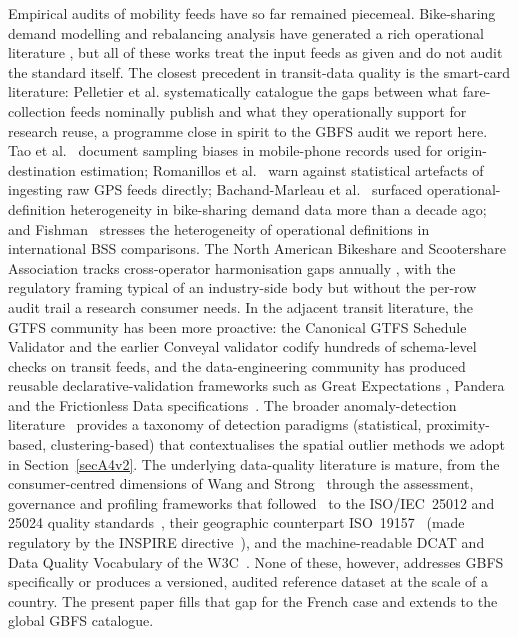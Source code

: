\documentclass[11pt,a4paper]{article}
\begin{document}
Empirical audits of mobility feeds have so far remained piecemeal.
Bike-sharing demand modelling and rebalancing analysis have generated
a rich operational literature
\cite{Buehler2017BikeShare,Medard2017Rebalancing,Eren2020Review}, but
all of these works treat the input feeds as given and do not audit
the standard itself. The closest precedent in transit-data quality
is the smart-card literature: Pelletier et al.
\cite{Pelletier2011SmartCard} systematically catalogue the gaps
between what fare-collection feeds nominally publish and what they
operationally support for research reuse, a programme close in spirit to
the GBFS audit we report here.
Tao et al.~\cite{Tao2020} document sampling biases in
mobile-phone records used for origin-destination estimation;
Romanillos et al.~\cite{Romanillos2016} warn against
statistical artefacts of ingesting raw GPS feeds directly;
Bachand-Marleau et al.~\cite{BachandMarleau2012} surfaced
operational-definition heterogeneity in bike-sharing demand data
more than a decade ago; and Fishman~\cite{Fishman2016} stresses the
heterogeneity of operational definitions in international BSS
comparisons. The North American Bikeshare and Scootershare
Association tracks cross-operator harmonisation gaps annually
\cite{NABSA2024StateOfIndustry}, with the regulatory framing
typical of an industry-side body but without the per-row audit
trail a research consumer needs.
In the adjacent transit literature, the GTFS community has been more
proactive: the Canonical GTFS Schedule Validator
\cite{MobilityData2024Validator} and the earlier Conveyal validator
\cite{Antrim2013Conveyal} codify hundreds of schema-level checks on
transit feeds, and the data-engineering community has produced reusable
declarative-validation frameworks such as Great Expectations
\cite{GreatExpectations2024}, Pandera~\cite{Pandera2024} and the
Frictionless Data specifications~\cite{FrictionlessData2023}.
The broader anomaly-detection literature~\cite{Chandola2009AnomalyDetection}
provides a taxonomy of detection paradigms (statistical, proximity-based,
clustering-based) that contextualises the spatial outlier methods we
adopt in Section~\ref{secA4v2}.
The underlying data-quality literature is mature, from the consumer-centred
dimensions of Wang and Strong~\cite{Wang1996Quality} through the assessment,
governance and profiling frameworks that
followed~\cite{Pipino2002Assessment,Khatri2010DataGovernance,SebastianColeman2013,Naumann2014DataProfiling}
to the ISO/IEC~25012 and 25024 quality standards~\cite{ISO25012,ISO25024},
their geographic counterpart ISO~19157~\cite{ISO19157} (made regulatory by the
INSPIRE directive~\cite{INSPIRE2007}), and the machine-readable DCAT and Data
Quality Vocabulary of the W3C~\cite{DCAT2020,W3CDQV}. None of these, however,
addresses GBFS specifically or produces a versioned, audited reference dataset
at the scale of a country. The present paper fills that gap for the French case
and extends to the global GBFS catalogue.
\end{document}

